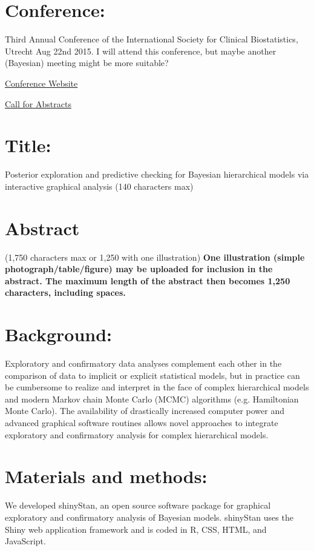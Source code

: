 \documentclass[11pt,notitlepage]{article}
\begin{document}
\section*{Conference:}

Third Annual Conference of the International Society for Clinical Biostatistics, Utrecht Aug 22nd 2015. I will attend this conference, but maybe another (Bayesian) meeting might be more suitable?

\href{http://www.iscb.info/ISCB2015.html}{Conference Website}

\href{http://www.iscb2015.info/abstract-submission}{Call for Abstracts}



\section*{Title:}

Posterior exploration and predictive checking for Bayesian hierarchical models via interactive graphical analysis (140 characters max)
\section*{Abstract}
(1,750 characters max or 1,250 with one illustration) \textbf{One illustration (simple photograph/table/figure) may be uploaded for inclusion in the abstract. The maximum length of the abstract then becomes 1,250 characters, including spaces.}

\section*{Background:}
Exploratory and confirmatory data analyses complement each other in the comparison of data to implicit or explicit statistical models, but in practice can be cumbersome to realize and interpret in the face of complex hierarchical models and modern Markov chain Monte Carlo (MCMC) algorithms (e.g. Hamiltonian Monte Carlo). The availability of drastically increased computer power and advanced graphical software routines allows novel approaches to integrate exploratory and confirmatory analysis for complex hierarchical models.
  
\section*{Materials and methods:}
We developed shinyStan, an open source software package for graphical exploratory and confirmatory analysis of Bayesian models. shinyStan uses the Shiny web application framework and is coded in R, CSS, HTML, and JavaScript.  
\end{document}
